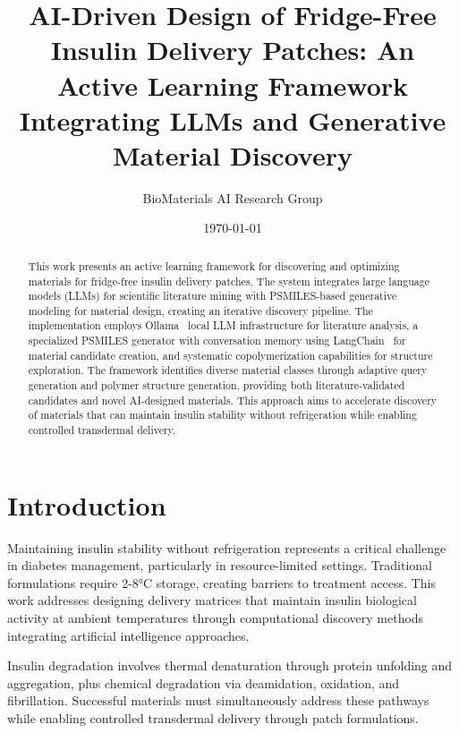 \documentclass[%
 reprint,
 amsmath,amssymb,
 aps,
]{revtex4-2}
\begin{document}
\title{AI-Driven Design of Fridge-Free Insulin Delivery Patches: An Active Learning Framework Integrating LLMs and Generative Material Discovery}

\author{BioMaterials AI Research Group}
%

\date{\today}

\begin{abstract}
This work presents an active learning framework for discovering and optimizing materials for fridge-free insulin delivery patches. The system integrates large language models (LLMs) for scientific literature mining with PSMILES-based generative modeling for material design, creating an iterative discovery pipeline. The implementation employs Ollama~\cite{ollama2023} local LLM infrastructure for literature analysis, a specialized PSMILES generator with conversation memory using LangChain~\cite{chase2022langchain} for material candidate creation, and systematic copolymerization capabilities for structure exploration. The framework identifies diverse material classes through adaptive query generation and polymer structure generation, providing both literature-validated candidates and novel AI-designed materials. This approach aims to accelerate discovery of materials that can maintain insulin stability without refrigeration while enabling controlled transdermal delivery.
\end{abstract}

\maketitle

\section{Introduction}

Maintaining insulin stability without refrigeration represents a critical challenge in diabetes management, particularly in resource-limited settings. Traditional formulations require 2-8°C storage, creating barriers to treatment access. This work addresses designing delivery matrices that maintain insulin biological activity at ambient temperatures through computational discovery methods integrating artificial intelligence approaches.

Insulin degradation involves thermal denaturation through protein unfolding and aggregation, plus chemical degradation via deamidation, oxidation, and fibrillation. Successful materials must simultaneously address these pathways while enabling controlled transdermal delivery through patch formulations.
\end{document}
